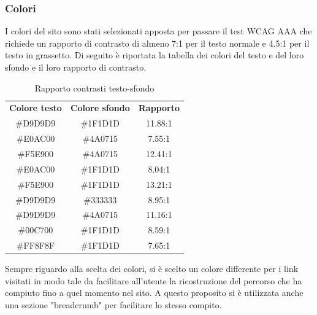 \documentclass{article}
\begin{document}
			\subsubsection{Colori}
				I colori del sito sono stati selezionati apposta per passare il test WCAG AAA che richiede un rapporto di contrasto di almeno 7:1 per il testo normale e 4.5:1 per il testo in grassetto. Di seguito è riportata la tabella dei colori del testo e del loro sfondo e il loro rapporto di contrasto.
				\captionsetup[table]{name=Tabella}
				\setlength{\tabcolsep}{18pt}
				\renewcommand{\arraystretch}{1.5}
				\begin{table}[htp] %
					\begin{center}
						\caption {Rapporto contrasti testo-sfondo}
						 \normalsize\mdseries
						\begin{tabular}{ c c c }
							\rowcolor{custom}
							\bfseries\color{white} Colore testo & \bfseries\color{white} Colore sfondo & \bfseries\color{white} Rapporto \\
							\#D9D9D9 & \#1F1D1D & 11.88:1  \\ %
							\#E0AC00 & \#4A0715 & 7.55:1  \\ %
							\#F5E900 & \#4A0715 & 12.41:1  \\ %
							\#E0AC00 & \#1F1D1D & 8.04:1  \\ %
							\#F5E900 & \#1F1D1D & 13.21:1  \\ %
							\#D9D9D9 & \#333333 & 8.95:1  \\ %
							\#D9D9D9 & \#4A0715 & 11.16:1  \\ %
							\#00C700 & \#1F1D1D & 8.59:1  \\ %
							\#FF8F8F & \#1F1D1D & 7.65:1  \\ 
						\end{tabular}
					\end{center}
				\end{table}
				\newline
				Sempre riguardo alla scelta dei colori, si è scelto un colore differente per i link visitati in modo tale da facilitare all'utente la ricostruzione del percorso che ha compiuto fino a quel momento nel sito. A questo proposito si è utilizzata anche una sezione "breadcrumb" per facilitare lo stesso compito.
\end{document}
